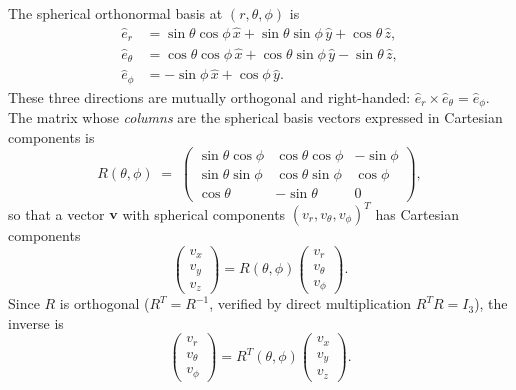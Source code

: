 \documentclass[11pt]{article}
\begin{document}
The spherical orthonormal basis at $(r,\theta,\phi)$ is
\begin{align}
  \hat{e}_r      &= \sin\theta\cos\phi\,\hat{x}
                  + \sin\theta\sin\phi\,\hat{y}
                  + \cos\theta\,\hat{z},
                  \label{eq:e-r}\\
  \hat{e}_\theta &= \cos\theta\cos\phi\,\hat{x}
                  + \cos\theta\sin\phi\,\hat{y}
                  - \sin\theta\,\hat{z},
                  \label{eq:e-theta}\\
  \hat{e}_\phi   &= -\sin\phi\,\hat{x}
                  + \cos\phi\,\hat{y}.
                  \label{eq:e-phi}
\end{align}
These three directions are mutually orthogonal and right-handed:
$\hat{e}_r \times \hat{e}_\theta = \hat{e}_\phi$.
The matrix whose \emph{columns} are the spherical basis vectors expressed in
Cartesian components is
\begin{equation}
  R(\theta,\phi)
  \;=\;
  \begin{pmatrix}
    \sin\theta\cos\phi & \cos\theta\cos\phi & -\sin\phi \\
    \sin\theta\sin\phi & \cos\theta\sin\phi &  \cos\phi \\
    \cos\theta         & -\sin\theta        &  0
  \end{pmatrix},
  \label{eq:R-matrix}
\end{equation}
so that a vector $\mathbf{v}$ with spherical components
$(v_r, v_\theta, v_\phi)^T$ has Cartesian components
\begin{equation}
  \begin{pmatrix}v_x\\v_y\\v_z\end{pmatrix}
  = R(\theta,\phi)
  \begin{pmatrix}v_r\\v_\theta\\v_\phi\end{pmatrix}.
  \label{eq:sph-to-cart-vec}
\end{equation}
Since $R$ is orthogonal ($R^T = R^{-1}$, verified by direct multiplication
$R^T R = I_3$), the inverse is
\begin{equation}
  \begin{pmatrix}v_r\\v_\theta\\v_\phi\end{pmatrix}
  = R^T(\theta,\phi)
  \begin{pmatrix}v_x\\v_y\\v_z\end{pmatrix}.
  \label{eq:cart-to-sph-vec}
\end{equation}
\end{document}
